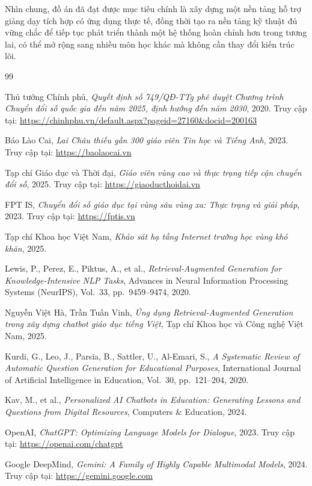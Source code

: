 \documentclass[12pt,a4paper]{article}
\begin{document}
	Nhìn chung, đồ án đã đạt được mục tiêu chính là xây dựng một nền tảng hỗ trợ giảng dạy tích hợp có ứng dụng thực tế, đồng thời tạo ra nền tảng kỹ thuật đủ vững chắc để tiếp tục phát triển thành một hệ thống hoàn chỉnh hơn trong tương lai, có thể mở rộng sang nhiều môn học khác mà không cần thay đổi kiến trúc lõi.
	
	\newpage
	\begin{thebibliography}{99}
		
		Thủ tướng Chính phủ, \textit{Quyết định số 749/QĐ-TTg phê duyệt Chương trình Chuyển đổi số quốc gia đến năm 2025, định hướng đến năm 2030}, 2020. Truy cập tại: \url{https://chinhphu.vn/default.aspx?pageid=27160&docid=200163}
		
		Báo Lào Cai, \textit{Lai Châu thiếu gần 300 giáo viên Tin học và Tiếng Anh}, 2023. Truy cập tại: \url{https://baolaocai.vn}
		
		Tạp chí Giáo dục và Thời đại, \textit{Giáo viên vùng cao và thực trạng tiếp cận chuyển đổi số}, 2025. Truy cập tại: \url{https://giaoducthoidai.vn}
		
		FPT IS, \textit{Chuyển đổi số giáo dục tại vùng sâu vùng xa: Thực trạng và giải pháp}, 2023. Truy cập tại: \url{https://fptis.vn}
		
		Tạp chí Khoa học Việt Nam, \textit{Khảo sát hạ tầng Internet trường học vùng khó khăn}, 2025.
		
		Lewis, P., Perez, E., Piktus, A., et al., \textit{Retrieval-Augmented Generation for Knowledge-Intensive NLP Tasks}, Advances in Neural Information Processing Systems (NeurIPS), Vol.~33, pp.~9459--9474, 2020.
		
		Nguyễn Việt Hà, Trần Tuấn Vinh, \textit{Ứng dụng Retrieval-Augmented Generation trong xây dựng chatbot giáo dục tiếng Việt}, Tạp chí Khoa học và Công nghệ Việt Nam, 2025.
		
		Kurdi, G., Leo, J., Parsia, B., Sattler, U., Al-Emari, S., \textit{A Systematic Review of Automatic Question Generation for Educational Purposes}, International Journal of Artificial Intelligence in Education, Vol.~30, pp.~121--204, 2020.
		
		Kav, M., et al., \textit{Personalized AI Chatbots in Education: Generating Lessons and Questions from Digital Resources}, Computers \& Education, 2024.
		
		OpenAI, \textit{ChatGPT: Optimizing Language Models for Dialogue}, 2023. Truy cập tại: \url{https://openai.com/chatgpt}
		
		Google DeepMind, \textit{Gemini: A Family of Highly Capable Multimodal Models}, 2024. Truy cập tại: \url{https://gemini.google.com}
		
	\end{thebibliography}
	
\end{document}
